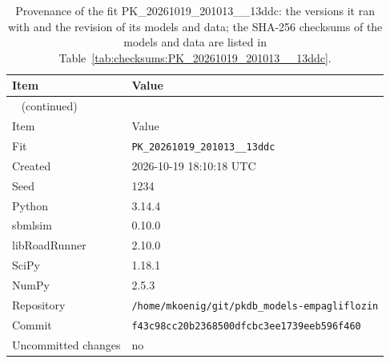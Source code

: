 \begin{longtable}{ll}
\caption{Provenance of the fit PK\_20261019\_201013\_\_13ddc: the versions it ran with and the revision of its models and data; the SHA-256 checksums of the models and data are listed in Table~\ref{tab:checksums:PK_20261019_201013__13ddc}.}\label{tab:provenance:PK_20261019_201013__13ddc} \\
\toprule
Item & Value \\
\midrule
\endfirsthead
\multicolumn{2}{l}{\small\tablename~\thetable{} (continued)} \\
\toprule
Item & Value \\
\midrule
\endhead
\bottomrule
\endlastfoot
Fit & \texttt{PK\_20261019\_201013\_\_13ddc} \\
Created & 2026-10-19 18:10:18 UTC \\
Seed & 1234 \\
Python & 3.14.4 \\
sbmlsim & 0.10.0 \\
libRoadRunner & 2.10.0 \\
SciPy & 1.18.1 \\
NumPy & 2.5.3 \\
Repository & \texttt{/home/mkoenig/git/pkdb\_models-empagliflozin} \\
Commit & \texttt{f43c98cc20b2368500dfcbc3ee1739eeb596f460} \\
Uncommitted changes & no \\
\end{longtable}



